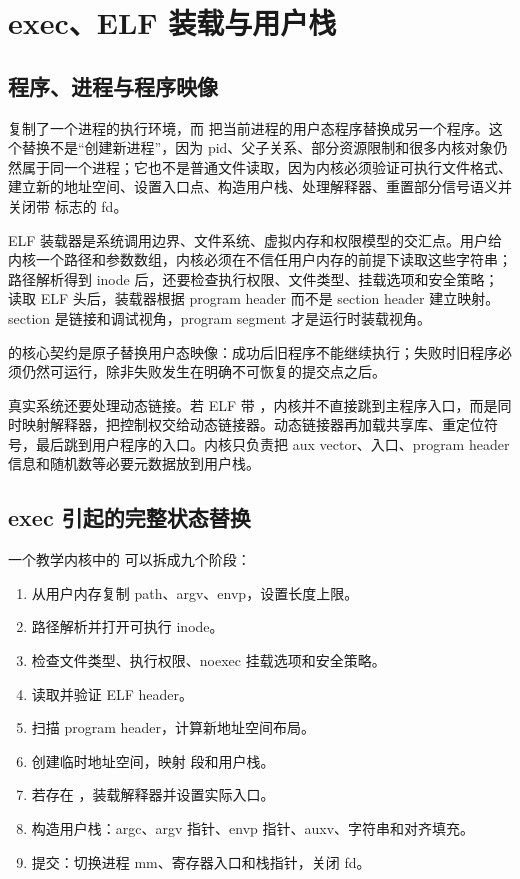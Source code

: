 \chapter{exec、ELF 装载与用户栈}

\section{程序、进程与程序映像}

 复制了一个进程的执行环境，而  把当前进程的用户态程序替换成另一个程序。这个替换不是“创建新进程”，因为 pid、父子关系、部分资源限制和很多内核对象仍然属于同一个进程；它也不是普通文件读取，因为内核必须验证可执行文件格式、建立新的地址空间、设置入口点、构造用户栈、处理解释器、重置部分信号语义并关闭带  标志的 fd。

ELF 装载器是系统调用边界、文件系统、虚拟内存和权限模型的交汇点。用户给内核一个路径和参数数组，内核必须在不信任用户内存的前提下读取这些字符串；路径解析得到 inode 后，还要检查执行权限、文件类型、挂载选项和安全策略；读取 ELF 头后，装载器根据 program header 而不是 section header 建立映射。section 是链接和调试视角，program segment 才是运行时装载视角。

\begin{keyidea}
 的核心契约是原子替换用户态映像：成功后旧程序不能继续执行；失败时旧程序必须仍然可运行，除非失败发生在明确不可恢复的提交点之后。
\end{keyidea}

真实系统还要处理动态链接。若 ELF 带 ，内核并不直接跳到主程序入口，而是同时映射解释器，把控制权交给动态链接器。动态链接器再加载共享库、重定位符号，最后跳到用户程序的入口。内核只负责把 aux vector、入口、program header 信息和随机数等必要元数据放到用户栈。

\section{exec 引起的完整状态替换}

一个教学内核中的  可以拆成九个阶段：

\begin{enumerate}
\tightlist
\item 从用户内存复制 path、argv、envp，设置长度上限。
\item 路径解析并打开可执行 inode。
\item 检查文件类型、执行权限、noexec 挂载选项和安全策略。
\item 读取并验证 ELF header。
\item 扫描 program header，计算新地址空间布局。
\item 创建临时地址空间，映射  段和用户栈。
\item 若存在 ，装载解释器并设置实际入口。
\item 构造用户栈：argc、argv 指针、envp 指针、auxv、字符串和对齐填充。
\item 提交：切换进程 mm、寄存器入口和栈指针，关闭  fd。
\end{enumerate}

